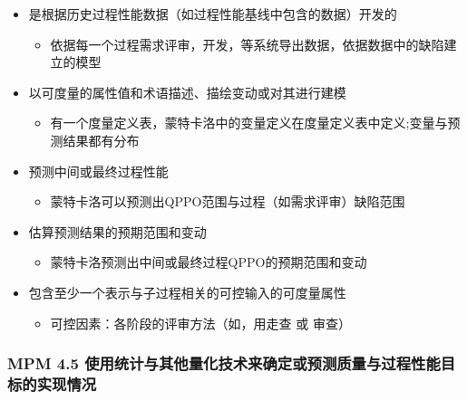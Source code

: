 \begin{itemize}
\tightlist
\item
  是根据历史过程性能数据（如过程性能基线中包含的数据）开发的

  \begin{itemize}
  \tightlist
  \item
    依据每一个过程需求评审，开发，等系统导出数据，依据数据中的缺陷建立的模型
  \end{itemize}
\item
  以可度量的属性值和术语描述、描绘变动或对其进行建模

  \begin{itemize}
  \tightlist
  \item
    有一个度量定义表，蒙特卡洛中的变量定义在度量定义表中定义;变量与预测结果都有分布
  \end{itemize}
\item
  预测中间或最终过程性能

  \begin{itemize}
  \tightlist
  \item
    蒙特卡洛可以预测出QPPO范围与过程（如需求评审）缺陷范围
  \end{itemize}
\item
  估算预测结果的预期范围和变动

  \begin{itemize}
  \tightlist
  \item
    蒙特卡洛预测出中间或最终过程QPPO的预期范围和变动
  \end{itemize}
\item
  包含至少一个表示与子过程相关的可控输入的可度量属性

  \begin{itemize}
  \tightlist
  \item
    可控因素：各阶段的评审方法（如，用走查 或 审查）
  \end{itemize}
\end{itemize}

\hypertarget{mpm-4.5-ux4f7fux7528ux7edfux8ba1ux4e0eux5176ux4ed6ux91cfux5316ux6280ux672fux6765ux786eux5b9aux6216ux9884ux6d4bux8d28ux91cfux4e0eux8fc7ux7a0bux6027ux80fdux76eeux6807ux7684ux5b9eux73b0ux60c5ux51b5}{%
\subsubsection{MPM 4.5
使用统计与其他量化技术来确定或预测质量与过程性能目标的实现情况}\label{mpm-4.5-ux4f7fux7528ux7edfux8ba1ux4e0eux5176ux4ed6ux91cfux5316ux6280ux672fux6765ux786eux5b9aux6216ux9884ux6d4bux8d28ux91cfux4e0eux8fc7ux7a0bux6027ux80fdux76eeux6807ux7684ux5b9eux73b0ux60c5ux51b5}}


